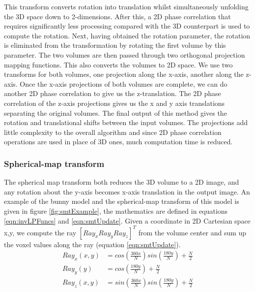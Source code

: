 This transform converts rotation into translation whilst simultaneously unfolding the 3D space down to 2-dimensions. After this, a 2D phase correlation that requires significantly less processing compared with the 3D counterpart is used to compute the rotation. Next, having obtained the rotation parameter, the rotation is eliminated from the transformation by rotating the first volume by this parameter. The two volumes are then passed through two orthogonal projection mapping functions. This also converts the volumes to 2D space. We use two transforms for both volumes, one projection along the x-axis, another along the z-axis. Once the x-axis projections of both volumes are complete, we can do another 2D phase correlation to give us the z-translation. The 2D phase correlation of the z-axis projections gives us the x and y axis translations separating the original volumes. The final output of this method gives the rotation and translational shifts between the input volumes. The projections add little complexity to the overall algorithm and since 2D phase correlation operations are used in place of 3D ones, much computation time is reduced.

\subsubsection{Spherical-map transform}
\label{SMTransform}
The spherical map transform both reduces the 3D volume to a 2D image, and any rotation about the y-axis becomes x-axis translation in the output image. An example of the bunny model and the spherical-map transform of this model is given in figure \ref{fig:smtExample}, the mathematics are defined in equations \ref{eqn:invLPFuncs} and \ref{eqn:smtUpdate}. Given a coordinate in 2D Cartesian space x,y, we compute the ray $[Ray_x Ray_y Ray_z]^T$ from the volume center and sum up the voxel values along the ray (equation \ref{eqn:smtUpdate}). \\


\begin{equation} \label{eqn:invLPFuncs}
\begin{split}
Ray_x(x,y) & = cos\left(\frac{360x}{N}\right)sin\left(\frac{180y}{N}\right)  + \frac{N}{2} \\
Ray_y(y) & = cos\left(\frac{180y}{N}\right) + \frac{N}{2} \\
Ray_z(x,y) & = 	sin\left(\frac{360x}{N}\right)sin\left(\frac{180y}{N}\right) + \frac{N}{2}
\end{split}
\end{equation}

